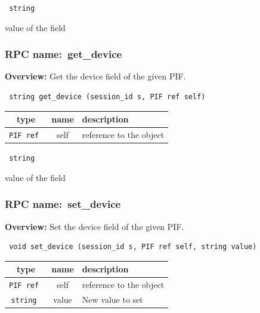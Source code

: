 \vspace{0.3cm}

{\tt 
string
}


value of the field
\vspace{0.3cm}
\vspace{0.3cm}
\vspace{0.3cm}
\subsubsection{RPC name:~get\_device}

{\bf Overview:} 
Get the device field of the given PIF.

\begin{verbatim} string get_device (session_id s, PIF ref self)\end{verbatim}



 
\vspace{0.3cm}
\begin{tabular}{|c|c|p{7cm}|}
 \hline
{\bf type} & {\bf name} & {\bf description} \\ \hline
{\tt PIF ref } & self & reference to the object \\ \hline 

\end{tabular}

\vspace{0.3cm}

{\tt 
string
}


value of the field
\vspace{0.3cm}
\vspace{0.3cm}
\vspace{0.3cm}
\subsubsection{RPC name:~set\_device}

{\bf Overview:} 
Set the device field of the given PIF.

\begin{verbatim} void set_device (session_id s, PIF ref self, string value)\end{verbatim}



 
\vspace{0.3cm}
\begin{tabular}{|c|c|p{7cm}|}
 \hline
{\bf type} & {\bf name} & {\bf description} \\ \hline
{\tt PIF ref } & self & reference to the object \\ \hline 

{\tt string } & value & New value to set \\ \hline 

\end{tabular}

